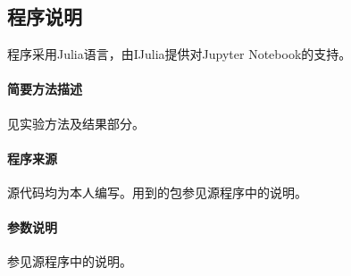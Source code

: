 \subsection{程序说明}
程序采用{\ttfamily Julia}语言，由{\ttfamily IJulia}提供对{\ttfamily Jupyter Notebook}的支持。
\paragraph{简要方法描述} 见实验方法及结果部分。
\paragraph{程序来源} 源代码均为本人编写。用到的包参见源程序中的说明。
\paragraph{参数说明} 参见源程序中的说明。



